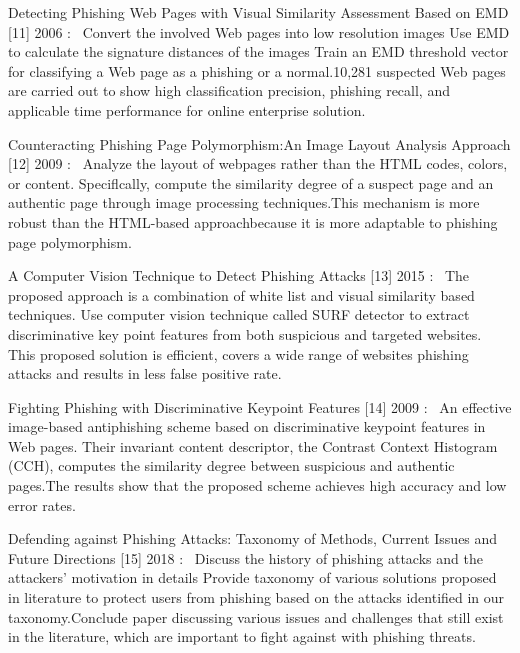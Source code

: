 \hspace{.2cm} Detecting Phishing Web Pages with Visual Similarity Assessment Based on EMD 
[11] 2006 :  Convert the involved Web pages into low resolution images
Use EMD to calculate the signature distances of the images
Train an EMD threshold vector for classifying a Web page as a phishing or a normal.10,281 suspected Web pages are carried out to show high classification precision, phishing recall, and applicable time performance for online enterprise solution. 

\hspace{.2cm} Counteracting Phishing Page Polymorphism:An Image Layout Analysis Approach 
[12] 2009 :  Analyze the layout of webpages rather than the HTML codes, colors, or content. Speciflcally, compute the similarity degree of a suspect page and an authentic page through image processing techniques.This mechanism is more robust than the HTML-based approachbecause it is more adaptable to phishing page polymorphism. 

\hspace{.2cm} A Computer Vision Technique to Detect Phishing Attacks
[13] 2015 :  The proposed approach is a combination of white list and visual similarity based techniques. Use computer vision technique called SURF detector to extract discriminative key point features from both suspicious and targeted websites.
 This proposed solution is efficient, covers a wide range of websites phishing attacks and results in less false positive rate.
 

\hspace{.2cm} Fighting Phishing with Discriminative Keypoint Features
[14] 2009 :  An effective image-based antiphishing scheme based on discriminative keypoint features in Web pages. Their invariant content descriptor, the Contrast Context Histogram (CCH), computes the similarity degree between suspicious and authentic pages.The results show that the proposed scheme achieves high accuracy and low error rates.

\hspace{.2cm} Defending against Phishing Attacks: Taxonomy of Methods, Current Issues and Future Directions
[15] 2018 :  Discuss the history of phishing attacks and the attackers’ motivation in details
Provide taxonomy of various solutions proposed in literature to protect users from phishing based on the attacks identified in our taxonomy.Conclude paper discussing various issues and challenges that still exist in the literature, which are important to fight against with phishing threats.

